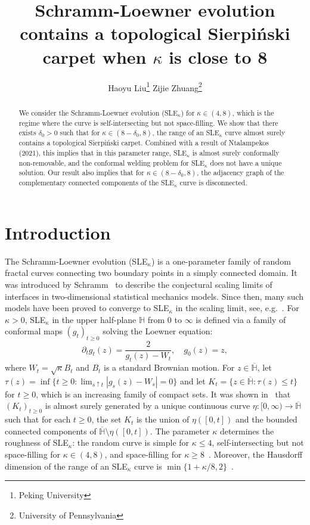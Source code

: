 \documentclass[a4paper]{article}
\title{Schramm-Loewner evolution contains a topological Sierpi\'nski carpet when $\kappa$ is close to 8}
\author{Haoyu Liu\thanks{Peking University} \qquad \qquad Zijie Zhuang\thanks{University of Pennsylvania}}
\numberwithin{equation}{section}
\numberwithin{equation}{section}
\renewcommand{\1}{\mathbf{1}}
\begin{document}
\maketitle

\begin{abstract}
    We consider the Schramm-Loewner evolution (SLE$_\kappa$) for $\kappa \in (4,8)$, which is the regime where the curve is self-intersecting but not space-filling. We show that there exists $\delta_0>0$ such that for $\kappa \in (8 - \delta_0,8)$, the range of an SLE$_\kappa$ curve almost surely contains a topological Sierpi\'nski carpet. Combined with a result of Ntalampekos (2021), this implies that in this parameter range, SLE$_\kappa$ is almost surely conformally non-removable, and the conformal welding problem for SLE$_\kappa$ does not have a unique solution. Our result also implies that for $\kappa \in (8 - \delta_0,8)$, the adjacency graph of the complementary connected components of the SLE$_\kappa$ curve is disconnected.
\end{abstract}

\setcounter{tocdepth}{1}
\tableofcontents

\section{Introduction}\label{sec:intro}

The Schramm-Loewner evolution (SLE$_\kappa$) is a one-parameter family of random fractal curves connecting two boundary points in a simply connected domain. It was introduced by Schramm~\cite{Schramm-SLE} to describe the conjectural scaling limits of interfaces in two-dimensional statistical mechanics models. Since then, many such models have been proved to converge to SLE$_\kappa$ in the scaling limit, see, e.g.~\cite{Smirnov-per, LSW-looperased, Smirnov-ising}. For $\kappa>0$, SLE$_\kappa$ in the upper half-plane $\mathbb{H}$ from $0$ to $\infty$ is defined via a family of conformal maps $(g_t)_{t \geq 0}$ solving the Loewner equation:
\begin{equation}\label{eq:loewner}
\partial_t g_t(z) = \frac{2}{g_t(z) - W_t}, \quad g_0(z) = z,
\end{equation}
where $W_t = \sqrt{\kappa} B_t$ and $B_t$ is a standard Brownian motion. For $z \in \overline{\mathbb{H}}$, let $\tau(z) = \inf \{t\geq 0: \lim_{s \uparrow t} |g_s(z) - W_s| = 0\}$ and let $K_t = \{z \in \overline{\mathbb{H}}: \tau(z) \leq t \}$ for $t \geq 0$, which is an increasing family of compact sets. It was shown in~\cite{Rohde-Schramm-basic, LSW-looperased} that $(K_t)_{t \geq 0}$ is almost surely generated by a unique continuous curve $\eta:[0,\infty) \to \overline{\mathbb{H}}$ such that for each $t \geq 0$, the set $K_t$ is the union of $\eta([0, t])$ and the bounded connected components of $\overline{\mathbb{H}} \setminus \eta([0, t])$. The parameter $\kappa$ determines the roughness of SLE$_\kappa$: the random curve is simple for $\kappa \leq 4$, self-intersecting but not space-filling for $\kappa \in (4,8)$, and space-filling for $\kappa \geq 8$~\cite{Rohde-Schramm-basic}. Moreover, the Hausdorff dimension of the range of an SLE$_\kappa$ curve is $\min\{ 1 + \kappa/8, 2\}$~\cite{Rohde-Schramm-basic, Beffara-dimension}.
\end{document}
